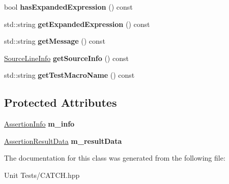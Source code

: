 \begin{DoxyCompactItemize}
\item 
bool {\bfseries has\+Expanded\+Expression} () const \hypertarget{classCatch_1_1AssertionResult_a122c369bd49430a304e3eaebdf184f36}{}\label{classCatch_1_1AssertionResult_a122c369bd49430a304e3eaebdf184f36}

\item 
std\+::string {\bfseries get\+Expanded\+Expression} () const \hypertarget{classCatch_1_1AssertionResult_a675d074588875eb62b0b6e36e05d65e6}{}\label{classCatch_1_1AssertionResult_a675d074588875eb62b0b6e36e05d65e6}

\item 
std\+::string {\bfseries get\+Message} () const \hypertarget{classCatch_1_1AssertionResult_a9793bfc4d24678c8a013bda84a5aa905}{}\label{classCatch_1_1AssertionResult_a9793bfc4d24678c8a013bda84a5aa905}

\item 
\hyperlink{structCatch_1_1SourceLineInfo}{Source\+Line\+Info} {\bfseries get\+Source\+Info} () const \hypertarget{classCatch_1_1AssertionResult_a68b73fe982a97fe6432af679af1a2dad}{}\label{classCatch_1_1AssertionResult_a68b73fe982a97fe6432af679af1a2dad}

\item 
std\+::string {\bfseries get\+Test\+Macro\+Name} () const \hypertarget{classCatch_1_1AssertionResult_a2901d41b199258ff6a44571b147169dd}{}\label{classCatch_1_1AssertionResult_a2901d41b199258ff6a44571b147169dd}

\end{DoxyCompactItemize}
\subsection*{Protected Attributes}
\begin{DoxyCompactItemize}
\item 
\hyperlink{structCatch_1_1AssertionInfo}{Assertion\+Info} {\bfseries m\+\_\+info}\hypertarget{classCatch_1_1AssertionResult_a3e7236f73a51d6fc8bb9dfdefcee7772}{}\label{classCatch_1_1AssertionResult_a3e7236f73a51d6fc8bb9dfdefcee7772}

\item 
\hyperlink{structCatch_1_1AssertionResultData}{Assertion\+Result\+Data} {\bfseries m\+\_\+result\+Data}\hypertarget{classCatch_1_1AssertionResult_add3455b8bbedb0d643e18da67c66b4f7}{}\label{classCatch_1_1AssertionResult_add3455b8bbedb0d643e18da67c66b4f7}

\end{DoxyCompactItemize}


The documentation for this class was generated from the following file\+:\begin{DoxyCompactItemize}
\item 
Unit Tests/C\+A\+T\+C\+H.\+hpp\end{DoxyCompactItemize}
